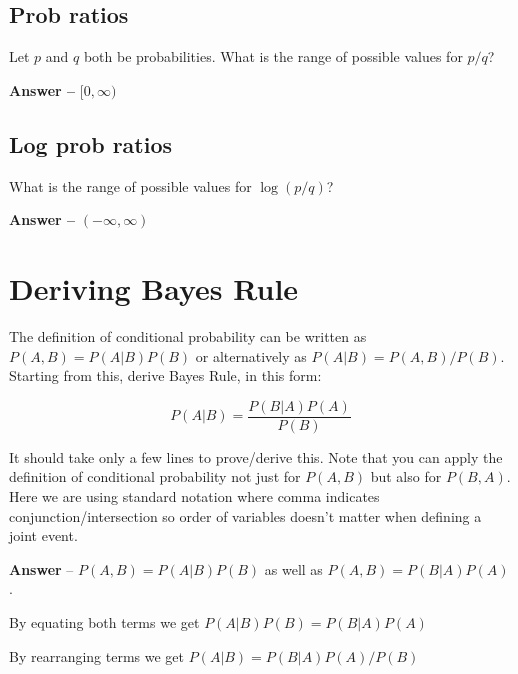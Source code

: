 \documentclass[11pt,letterpaper]{article}
\theoremstyle{definition}
\begin{document}
\subsection{Prob ratios}
Let $p$ and $q$ both be probabilities.
What is the range of possible values for $p/q$?

\textbf{Answer  -- }$[0, \infty)$

\subsection{Log prob ratios}
What is the range of possible values for $\log(p/q)$?

\textbf{Answer --} $(-\infty, \infty)$
%
%
%

%
%

\section{Deriving Bayes Rule}

The definition of conditional probability can be written as $P(A,B) = P(A|B)P(B)$ or alternatively as $P(A|B) = P(A,B)/P(B)$.
Starting from this, derive Bayes Rule, in this form:

\[ P(A|B) = \frac{P(B|A) P(A)}{P(B)} \]

\noindent
It should take only a few lines to prove/derive this.  Note that you can apply the definition of conditional probability not just for $P(A,B)$ but also for $P(B,A)$.  Here we are using standard notation where comma indicates conjunction/intersection so order of variables doesn't matter when defining a joint event.\newline


\textbf{Answer} --  $P(A,B) = P(A|B)P(B)$ as well as $P(A,B) = P(B|A)P(A)$.

By equating both terms we get  $P(A|B)P(B) = P(B|A)P(A)$

By rearranging terms we get $P(A|B) = P(B|A)P(A)/P(B)$

%
%
\end{document}
